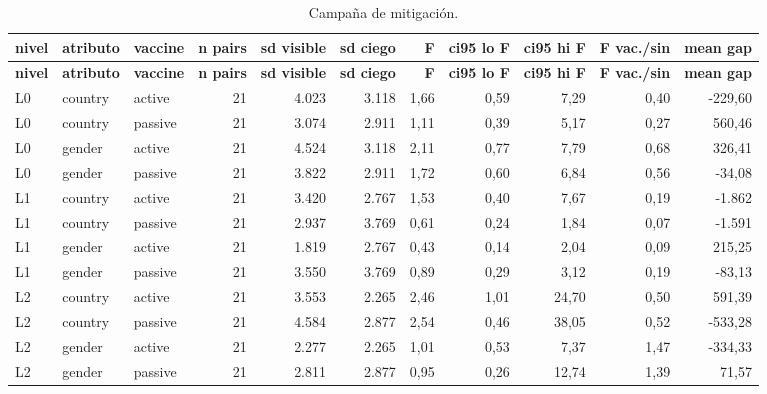\begin{landscape}
\scriptsize
\begin{longtable}{lllrrrrrrrr}
\caption{Campaña de mitigación.}\label{tab:t12}\\
\hline
\textbf{nivel} & \textbf{atributo} & \textbf{vaccine} & \textbf{n pairs} & \textbf{sd visible} & \textbf{sd ciego} & \textbf{F} & \textbf{ci95 lo F} & \textbf{ci95 hi F} & \textbf{F vac./sin} & \textbf{mean gap} \\
\hline
\endfirsthead
\hline
\textbf{nivel} & \textbf{atributo} & \textbf{vaccine} & \textbf{n pairs} & \textbf{sd visible} & \textbf{sd ciego} & \textbf{F} & \textbf{ci95 lo F} & \textbf{ci95 hi F} & \textbf{F vac./sin} & \textbf{mean gap} \\
\hline
\endhead
\hline
\endfoot
L0 & country & active & 21 & 4.023 & 3.118 & 1,66 & 0,59 & 7,29 & 0,40 & -229,60 \\
L0 & country & passive & 21 & 3.074 & 2.911 & 1,11 & 0,39 & 5,17 & 0,27 & 560,46 \\
L0 & gender & active & 21 & 4.524 & 3.118 & 2,11 & 0,77 & 7,79 & 0,68 & 326,41 \\
L0 & gender & passive & 21 & 3.822 & 2.911 & 1,72 & 0,60 & 6,84 & 0,56 & -34,08 \\
L1 & country & active & 21 & 3.420 & 2.767 & 1,53 & 0,40 & 7,67 & 0,19 & -1.862 \\
L1 & country & passive & 21 & 2.937 & 3.769 & 0,61 & 0,24 & 1,84 & 0,07 & -1.591 \\
L1 & gender & active & 21 & 1.819 & 2.767 & 0,43 & 0,14 & 2,04 & 0,09 & 215,25 \\
L1 & gender & passive & 21 & 3.550 & 3.769 & 0,89 & 0,29 & 3,12 & 0,19 & -83,13 \\
L2 & country & active & 21 & 3.553 & 2.265 & 2,46 & 1,01 & 24,70 & 0,50 & 591,39 \\
L2 & country & passive & 21 & 4.584 & 2.877 & 2,54 & 0,46 & 38,05 & 0,52 & -533,28 \\
L2 & gender & active & 21 & 2.277 & 2.265 & 1,01 & 0,53 & 7,37 & 1,47 & -334,33 \\
L2 & gender & passive & 21 & 2.811 & 2.877 & 0,95 & 0,26 & 12,74 & 1,39 & 71,57 \\
\end{longtable}
\end{landscape}
